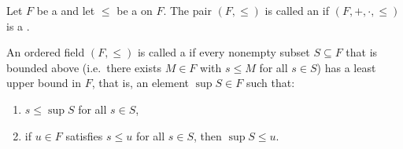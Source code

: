 \begin{definition} \label{definition:ordered_field_complete_ordered_field}
Let $F$ be a  and let $\leq$ be a  on $F$.
The pair $(F,\leq)$ is called an  if $(F,+,\cdot,\leq)$ is a .

An ordered field $(F,\leq)$ is called a  if every nonempty subset $S \subseteq F$ that is bounded above (i.e.\ there exists $M \in F$ with $s \leq M$ for all $s \in S$) has a least upper bound in $F$, that is, an element $\sup S \in F$ such that:
\begin{enumerate}
  \item $s \leq \sup S$ for all $s \in S$,
  \item if $u \in F$ satisfies $s \leq u$ for all $s \in S$, then $\sup S \leq u$.
\end{enumerate}
\end{definition}